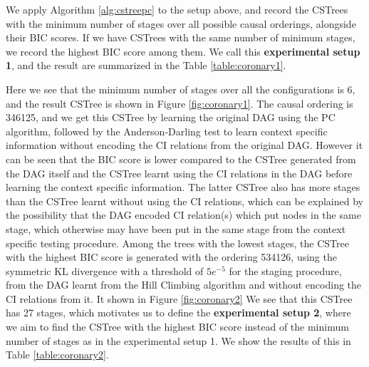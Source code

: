 \documentclass{tufte-book}
\begin{document}
We apply Algorithm \ref{alg:cstreepc} to the setup above, and record the CSTrees with the minimum number of stages over all possible causal orderings, alongside their BIC scores. If we have CSTrees with the same number of minimum stages, we record the highest BIC score among them. We call this \textbf{experimental setup 1}, and the result are summarized in the Table \ref{table:coronary1}.


Here we see that the minimum number of stages over all the configurations is 6, and the result CSTree is shown in Figure \ref{fig:coronary1}. The causal ordering is 346125, and we get this CSTree by learning the original DAG using the PC algorithm, followed by the Anderson-Darling test to learn context specific information without encoding the CI relations from the original DAG. However it can be seen that the BIC score is lower compared to the CSTree generated from the DAG itself and the CSTree learnt using the CI relations in the DAG before learning the context specific information. The latter CSTree also has more stages than the CSTree learnt without using the CI relations, which can be explained by the possibility that the DAG encoded CI relation(s) which put nodes in the same stage, which otherwise may have been put in the same stage from the context specific testing procedure. Among the trees with the lowest stages, the CSTree with the highest BIC score is generated with the ordering 534126, using the symmetric KL divergence with a threshold of \(5e^{-5}\) for the staging procedure, from the DAG learnt from the Hill Climbing algorithm and without encoding the CI relations from it. It shown in Figure \ref{fig:coronary2} We see that this CSTree has 27 stages, which motivates us to define the \textbf{experimental setup 2}, where we aim to find the CSTree with the highest BIC score instead of the minimum number of stages as in the experimental setup 1. We show the results of this in Table \ref{table:coronary2}.
\end{document}
